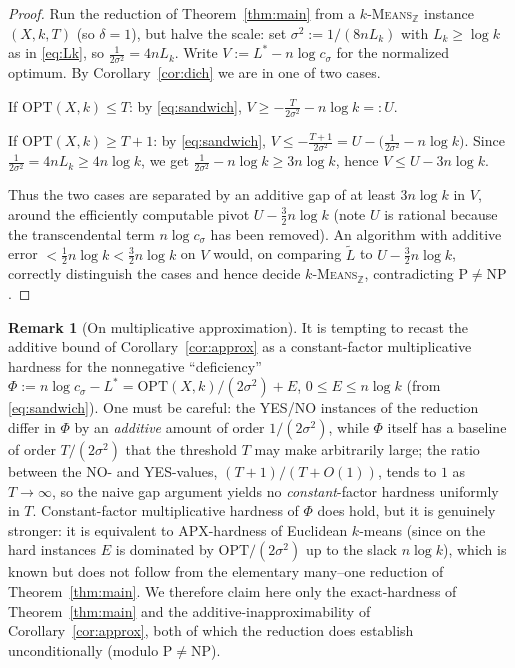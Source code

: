 \documentclass{amsart}
\theoremstyle{plain}
\theoremstyle{definition}
\newtheorem{remark}{Remark}
\newcommand{\Z}{\mathbb{Z}}
\begin{document}
\begin{proof}
Run the reduction of Theorem~\ref{thm:main} from a \textsc{$k$-Means$_{\Z}$}
instance $(X,k,T)$ (so $\delta=1$), but halve the scale: set
$\sigma^{2}:=1/(8nL_{k})$ with $L_{k}\ge\log k$ as in \eqref{eq:Lk}, so
$\tfrac{1}{2\sigma^{2}}=4nL_{k}$. Write $V:=L^{\ast}-n\log c_{\sigma}$ for the
normalized optimum. By Corollary~\ref{cor:dich} we are in one of two cases.

If $\mathrm{OPT}(X,k)\le T$: by \eqref{eq:sandwich},
$V\ge -\tfrac{T}{2\sigma^{2}}-n\log k=:U$.

If $\mathrm{OPT}(X,k)\ge T+1$: by \eqref{eq:sandwich},
$V\le -\tfrac{T+1}{2\sigma^{2}}=U-\big(\tfrac{1}{2\sigma^{2}}-n\log k\big)$. Since
$\tfrac{1}{2\sigma^{2}}=4nL_{k}\ge 4n\log k$, we get
$\tfrac{1}{2\sigma^{2}}-n\log k\ge 3n\log k$, hence $V\le U-3n\log k$.

Thus the two cases are separated by an additive gap of at least $3n\log k$ in $V$,
around the efficiently computable pivot $U-\tfrac32 n\log k$ (note $U$ is rational
because the transcendental term $n\log c_{\sigma}$ has been removed). An algorithm
with additive error $<\tfrac12 n\log k<\tfrac32 n\log k$ on $V$ would, on comparing
$\widetilde L$ to $U-\tfrac32 n\log k$, correctly distinguish the cases and hence
decide \textsc{$k$-Means$_{\Z}$}, contradicting $\mathrm{P}\ne\mathrm{NP}$.
\end{proof}

\begin{remark}[On multiplicative approximation]\label{rem:mult}
It is tempting to recast the additive bound of Corollary~\ref{cor:approx} as a
constant-factor multiplicative hardness for the nonnegative ``deficiency''
$\Phi:=n\log c_{\sigma}-L^{\ast}=\mathrm{OPT}(X,k)/(2\sigma^{2})+E$, $0\le E\le
n\log k$ (from \eqref{eq:sandwich}). One must be careful: the YES/NO instances of
the reduction differ in $\Phi$ by an \emph{additive} amount of order
$1/(2\sigma^{2})$, while $\Phi$ itself has a baseline of order
$T/(2\sigma^{2})$ that the threshold $T$ may make arbitrarily large; the ratio
between the NO- and YES-values, $(T+1)/(T+O(1))$, tends to $1$ as $T\to\infty$, so
the naive gap argument yields no \emph{constant}-factor hardness uniformly in $T$.
Constant-factor multiplicative hardness of $\Phi$ does hold, but it is genuinely
stronger: it is equivalent to APX-hardness of Euclidean $k$-means (since on the
hard instances $E$ is dominated by $\mathrm{OPT}/(2\sigma^{2})$ up to the slack
$n\log k$), which is known \cite{ACKS} but does not follow from the elementary
many--one reduction of Theorem~\ref{thm:main}. We therefore claim here only the
exact-hardness of Theorem~\ref{thm:main} and the additive-inapproximability of
Corollary~\ref{cor:approx}, both of which the reduction does establish
unconditionally (modulo $\mathrm{P}\ne\mathrm{NP}$).
\end{remark}
\end{document}
